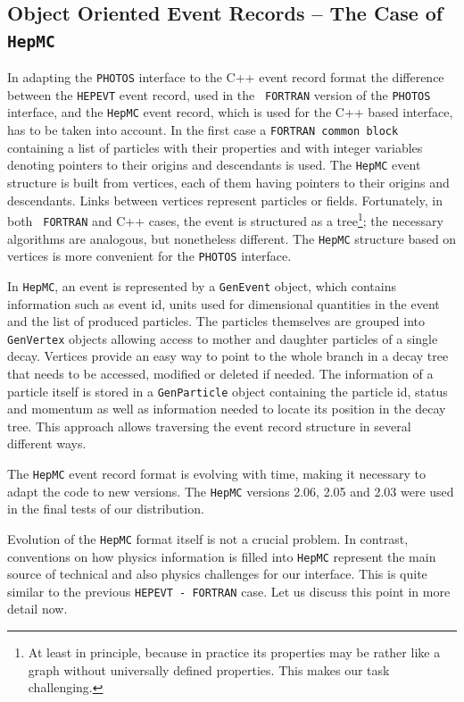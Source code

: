\documentclass[]{Photos_interface_design}
\begin{document}
\subsection{Object Oriented Event Records  -- The Case of {\tt HepMC}}
 In adapting the {\tt PHOTOS} interface to the C++ event record format
the difference between the {\tt HEPEVT} event record, used in the {\tt
  FORTRAN} version of the {\tt PHOTOS} interface, and the {\tt HepMC} event
record, which is used for the C++ based interface, has to be taken into
account.  In the first case 
a {\tt FORTRAN common block} containing a list of particles with their properties and
with integer variables denoting pointers to their origins and
descendants is used.  The {\tt HepMC} event structure is built from vertices,
each of them having pointers to their origins and descendants. Links
between vertices represent particles or fields.  Fortunately, in both {\tt
  FORTRAN} and C++ cases, the event is structured as a
tree\footnote{At least in principle, because in practice its
properties may be rather like a graph without universally defined
properties.  This makes our task challenging.}; the necessary
algorithms are analogous, but nonetheless different. The {\tt HepMC}
structure based on vertices is more convenient for the {\tt PHOTOS}
interface. 

In {\tt HepMC}, an event is represented by a {\tt GenEvent} object,
which contains information such as event id,
units used for dimensional quantities in the event and the list of produced particles. The particles
themselves are grouped into {\tt GenVertex} objects allowing access to mother
and daughter particles of a single decay. Vertices provide an easy way
to point to the whole branch in a decay tree that needs to be accessed,
modified or deleted if needed. The information of a particle  itself is stored
in a {\tt GenParticle} object containing the particle id, status and momentum
as well as information needed to locate its position in the decay tree.
This approach allows traversing the event record structure in several different
ways.

The {\tt HepMC} event record format is  evolving with time, making it necessary
 to adapt
the code to new versions. The
{\tt HepMC} versions 2.06, 2.05  and 2.03 were used  in the final tests of our 
distribution. 

Evolution of the {\tt HepMC} format itself is not a crucial problem.
In contrast, conventions on how physics information is  filled into {\tt HepMC}
represent the main source of technical and also physics 
challenges for our interface. 
This is quite similar to the previous
{\tt HEPEVT - FORTRAN} case. Let us discuss this point in more detail now.
\end{document}
